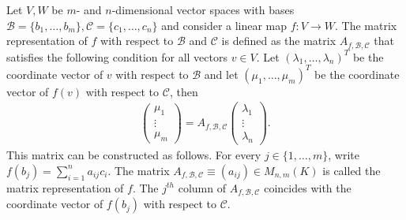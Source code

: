     \begin{construct}\label{linalgebra:matrix_representation}
        Let $V,W$ be $m$- and $n$-dimensional vector spaces with bases $\mathcal{B}=\{b_1,\ldots,b_m\},\mathcal{C}=\{c_1,\ldots,c_n\}$ and consider a linear map $f:V\rightarrow W$. The matrix representation of $f$ with respect to $\mathcal{B}$ and $\mathcal{C}$ is defined as the matrix $A_{f,\mathcal{B},\mathcal{C}}$ that satisfies the following condition for all vectors $v\in V$. Let $(\lambda_1,\ldots,\lambda_n)^T$ be the coordinate vector of $v$ with respect to $\mathcal{B}$ and let $(\mu_1,\ldots,\mu_m)^T$ be the coordinate vector of $f(v)$ with respect to $\mathcal{C}$, then
        \begin{gather}
            \label{linalgebra:matrix_representation_equation}
            \begin{pmatrix}
                \mu_1\\\vdots\\\mu_m
            \end{pmatrix}
            = A_{f,\mathcal{B},\mathcal{C}}
            \begin{pmatrix}
                \lambda_1\\\vdots\\\lambda_n
            \end{pmatrix}.
        \end{gather}
        This matrix can be constructed as follows. For every $j\in\{1,\ldots,m\}$, write $f(b_j) = \sum_{i=1}^na_{ij}c_i$. The matrix $A_{f,\mathcal{B},\mathcal{C}}\equiv(a_{ij})\in M_{n,m}(K)$ is called the matrix representation of $f$. The $j^{th}$ column of $A_{f,\mathcal{B},\mathcal{C}}$ coincides with the coordinate vector of $f(b_j)$ with respect to $\mathcal{C}$.
    \end{construct}

